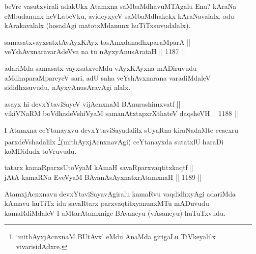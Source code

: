 \begin{artha}
beVre vasutxvirali adakUkx Atamxna saMbaMdhavuMTAgalu Enu? kAraNa eMbudanunx heVLabeVku, avideyxyeV saMbaMdhakekx kAraNavalalx, adu kArakavalalx (hosadAgi matotxMdanunx huTiTxsuvudalalx).
\end{artha}

\begin{shl}
samasatxvayxsatxtAvAyxKAyx tasAmxdanadhxparaMparA || \\
veYshAvxnaravarAdeVva na tu nAyxyAnusArataH \hfill || 1187 ||  
\end{shl}

\begin{artha}
adariMda samasatx vayxsatxveMdu vAyxKAyxna mADiruvudu aMdhaparaMpareyeV sari, adU saha veYshAvxnarana varadiMdaleV sididhxsuvudu, nAyxyAnusAravAgi alalx.
\end{artha}



\begin{shl}
asayx hi devxYtaviSayeV vijAcnxnaM BAnurashimxvatf || \\
\footnotemark[2]vikiVNaRM boVdhadeVshiVyaM samanAtxtapxrXthateV daqsheVH \hfill || 1188 ||  
\end{shl}

\begin{artha}
I Atamxna ceYtanayxvu devxYtaviSayadalilx sUyaRna kiraNadaMte ecacxru parxdeVshadalilx \footnote{`mithAyxjAcnxnaM BUtAvx' eMdu AnaMda girigaLu TiVkeyalilx vivarisidAdxre.}(mithAyxjAcnxnavAgi) ceYtanayxda sutatxlU haraDi koMDidudx toVruvudu.
\end{artha}

\begin{shl}
tatarx kamaRparxsUtoV\s yaM kAmaH savaRparxvaqtitxkaqtf || \\
jAtA kamaRNa EveVyaM BAvanA\s sAyxnatxrAtamxnaH \hfill || 1189 ||  
\end{shl}

\begin{artha}
AtamxjAcnxnavu devxYtaviSayavAgiralu kamaRvu vaqdidhxyAgi adariMda kAmavu huTiTx idu savaRtarx parxvaqtitxyanunxMTu mADuvudu kamaRdiMdaleV I aMtarAtamxnige BAvaneyu (vAsaneyu) huTuTxvudu.
\end{artha}

